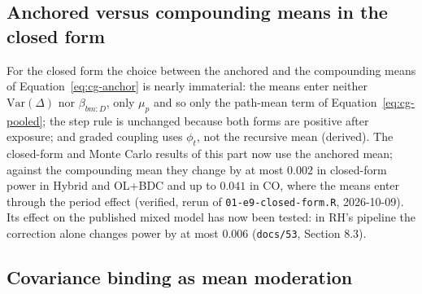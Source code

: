 \documentclass[11pt]{article}
\newcommand{\code}[1]{\texttt{#1}}
\begin{document}
\subsection{Anchored versus compounding means in the closed form}
\label{sec:cg-anchor-closed}

For the closed form the choice between the anchored and the
compounding means of Equation~\eqref{eq:cg-anchor} is nearly
immaterial: the means enter
neither $\mathrm{Var}(\Delta)$ nor $\beta_{bm:D}$, only $\mu_p$ and so
only the path-mean term of Equation~\eqref{eq:cg-pooled}; the step
rule is unchanged because both forms are positive after exposure; and
graded coupling uses $\phi_t$, not the recursive mean (derived). The
closed-form and Monte Carlo results of this part now use the anchored
mean; against the compounding mean they change by at most $0.002$ in
closed-form power in Hybrid and OL+BDC and up to $0.041$ in CO, where
the means enter through the period effect (verified, rerun of
\code{01-e9-closed-form.R}, 2026-10-09). Its effect on the published
mixed model has now been tested: in RH's pipeline the correction alone
changes power by at most $0.006$ (\code{docs/53}, Section 8.3).

\subsection{Covariance binding as mean moderation}
\label{sec:cg-equiv}
\end{document}
